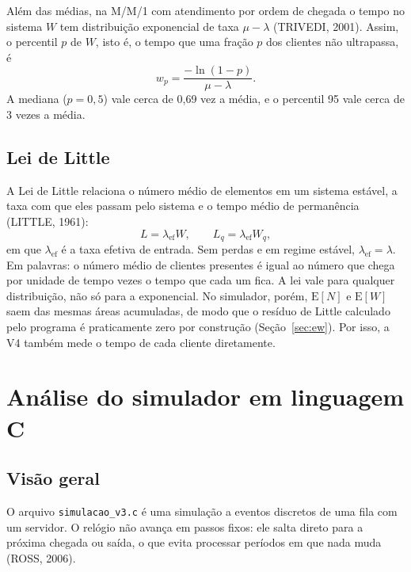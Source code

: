 \documentclass[
  article,      %
  10pt,         %
  oneside,
  a4paper,
  twocolumn,    %
  english,
  brazil        %
]{abntex2}
\newcommand{\EN}{\mathrm{E}[N]}
\newcommand{\EW}{\mathrm{E}[W]}
\begin{document}
Além das médias, na M/M/1 com atendimento por ordem de chegada o tempo no sistema $W$ tem distribuição exponencial de taxa $\mu-\lambda$ (TRIVEDI, 2001). Assim, o percentil $p$ de $W$, isto é, o tempo que uma fração $p$ dos clientes não ultrapassa, é
\begin{equation}
  w_p=\frac{-\ln(1-p)}{\mu-\lambda}.
  \label{eq:percentil}
\end{equation}
A mediana ($p=0{,}5$) vale cerca de 0,69 vez a média, e o percentil 95 vale cerca de 3 vezes a média.

\subsection{Lei de Little}

A Lei de Little relaciona o número médio de elementos em um sistema estável, a taxa com que eles passam pelo sistema e o tempo médio de permanência (LITTLE, 1961):
\begin{equation}
  L=\lambda_{\mathrm{ef}}W,
  \qquad
  L_q=\lambda_{\mathrm{ef}}W_q,
  \label{eq:little-sistema}
\end{equation}
em que $\lambda_{\mathrm{ef}}$ é a taxa efetiva de entrada. Sem perdas e em regime estável, $\lambda_{\mathrm{ef}}=\lambda$. Em palavras: o número médio de clientes presentes é igual ao número que chega por unidade de tempo vezes o tempo que cada um fica. A lei vale para qualquer distribuição, não só para a exponencial. No simulador, porém, $\EN$ e $\EW$ saem das mesmas áreas acumuladas, de modo que o resíduo de Little calculado pelo programa é praticamente zero por construção (Seção~\ref{sec:ew}). Por isso, a V4 também mede o tempo de cada cliente diretamente.


\section{Análise do simulador em linguagem C}

\subsection{Visão geral}

O arquivo \texttt{simulacao\_v3.c} é uma simulação a eventos discretos de uma fila com um servidor. O relógio não avança em passos fixos: ele salta direto para a próxima chegada ou saída, o que evita processar períodos em que nada muda (ROSS, 2006).
\end{document}

